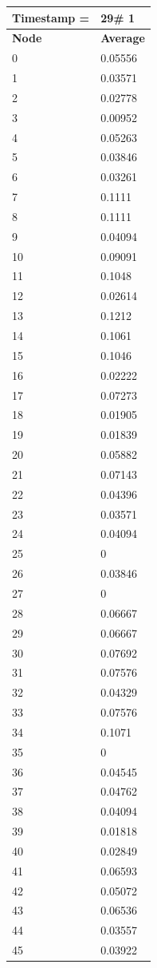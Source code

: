 \begin{tabular}{|l||l|}
\hline
\textbf{Timestamp =} & \textbf{29}\# 1\\\hline
	\textbf{Node} & \textbf{Average} \\ \hline
\hline
	0 & 0.05556 \\ \hline
	1 & 0.03571 \\ \hline
	2 & 0.02778 \\ \hline
	3 & 0.00952 \\ \hline
	4 & 0.05263 \\ \hline
	5 & 0.03846 \\ \hline
	6 & 0.03261 \\ \hline
	7 & 0.1111 \\ \hline
	8 & 0.1111 \\ \hline
	9 & 0.04094 \\ \hline
	10 & 0.09091 \\ \hline
	11 & 0.1048 \\ \hline
	12 & 0.02614 \\ \hline
	13 & 0.1212 \\ \hline
	14 & 0.1061 \\ \hline
	15 & 0.1046 \\ \hline
	16 & 0.02222 \\ \hline
	17 & 0.07273 \\ \hline
	18 & 0.01905 \\ \hline
	19 & 0.01839 \\ \hline
	20 & 0.05882 \\ \hline
	21 & 0.07143 \\ \hline
	22 & 0.04396 \\ \hline
	23 & 0.03571 \\ \hline
	24 & 0.04094 \\ \hline
	25 & 0 \\ \hline
	26 & 0.03846 \\ \hline
	27 & 0 \\ \hline
	28 & 0.06667 \\ \hline
	29 & 0.06667 \\ \hline
	30 & 0.07692 \\ \hline
	31 & 0.07576 \\ \hline
	32 & 0.04329 \\ \hline
	33 & 0.07576 \\ \hline
	34 & 0.1071 \\ \hline
	35 & 0 \\ \hline
	36 & 0.04545 \\ \hline
	37 & 0.04762 \\ \hline
	38 & 0.04094 \\ \hline
	39 & 0.01818 \\ \hline
	40 & 0.02849 \\ \hline
	41 & 0.06593 \\ \hline
	42 & 0.05072 \\ \hline
	43 & 0.06536 \\ \hline
	44 & 0.03557 \\ \hline
	45 & 0.03922 \\ \hline
\end{tabular}

